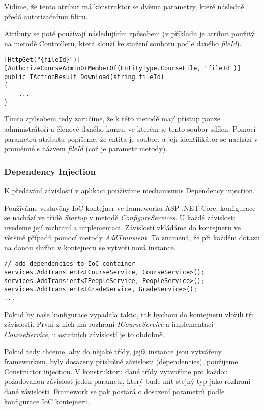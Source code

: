 Vidíme, že tento atribut má konstruktor se dvěma parametry, které následně předá autorizačnímu filtru. 

Atributy se poté používají následujícím způsobem (v příkladu je atribut použitý na metodě Controlleru, která slouží ke stažení souboru podle daného \textit{fileId}).
\begin{lstlisting}
[HttpGet("{fileId}")]
[AuthorizeCourseAdminOrMemberOf(EntityType.CourseFile, "fileId")]
public IActionResult Download(string fileId)
{
	...
}
\end{lstlisting}

Tímto způsobem tedy zaručíme, že k této metodě mají přístup pouze administrátoři a členové daného kurzu, ve kterém je tento soubor sdílen. Pomocí parametrů atributu popíšeme, že entita je soubor, a její identifikátor se nachází v proměnné s názvem \textit{fileId} (což je parametr metody).

\subsubsection*{Dependency Injection}

K předávání závislostí v aplikaci používáme mechanismus Dependency injection. 

Používáme vestavěný IoC kontejner ve frameworku ASP .NET Core, konfigurace se nachází ve třídě \textit{Startup} v metodě \textit{ConfigureServices}.
U každé závislosti uvedeme její rozhraní a implementaci. 
Závislosti vkládáme do kontejneru ve většině případů pomocí metody \textit{AddTransient}. To znamená, že při každém dotazu na danou službu v kontejneru se vytvoří nová instance.
\begin{lstlisting}
// add dependencies to IoC container
services.AddTransient<ICourseService, CourseService>();
services.AddTransient<IPeopleService, PeopleService>();
services.AddTransient<IGradeService, GradeService>();
...
\end{lstlisting}
Pokud by naše konfigurace vypadala takto, tak bychom do kontejneru vložili tři závislosti. První z nich má rozhraní \textit{ICourseService} a implementaci \textit{CourseService}, u ostatních závislostí je to obdobně.

Pokud tedy chceme, aby do nějaké třídy, jejíž instance jsou vytvářeny frameworkem, byly dosazeny příslušné závislosti (dependencies), použijeme Constructor injection. V konstruktoru dané třídy vytvoříme pro každou požadovanou závislost jeden parametr, který bude mít stejný typ jako rozhraní dané závislosti. Framework se pak postará o dosazení parametrů podle konfigurace IoC kontejneru.

